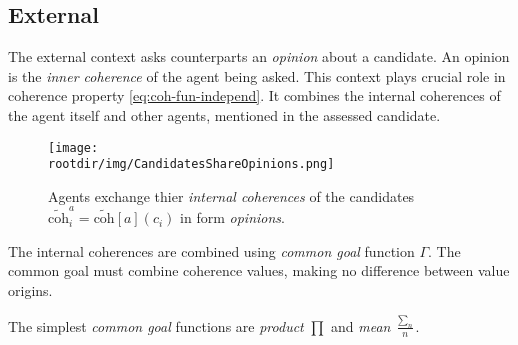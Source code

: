 \documentclass[../ThesisDoc]{subfiles}
\begin{document}
\providecommand{\rootdir}{..}

\def\coh{\mathrm{coh}}
\def\cohi{\mathrm{\widetilde{coh}}}

\subsection{External}

The external context asks counterparts an \emph{opinion} about a candidate.
An opinion is the \emph{inner coherence} of the agent being asked. This context
plays crucial role in coherence property \ref{eq:coh-fun-independ}. It combines
the internal coherences of the agent itself and other agents, mentioned in the
assessed candidate.


\begin{figure}[h]
  \label{fig:CandidatesShareOpinions}
  \texttt{[image: \\rootdir/img/CandidatesShareOpinions.png]}
  \caption{Agents exchange thier \emph{internal coherences} of the candidates
            $\cohi^a_i = \cohi[a](c_i)$ in form \emph{opinions}.
          }
\end{figure}

The internal coherences are combined using \emph{common goal} function $\Gamma$.
The common goal must combine coherence values, making no difference
between value origins.

The simplest \emph{common goal} functions are \emph{product} $\prod$
and \emph{mean} $\frac{\sum_n}{n}$.


\end{document}
